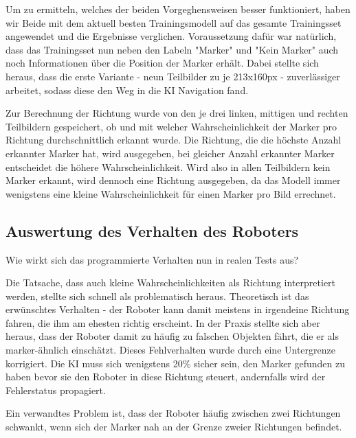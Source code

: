 \documentclass[conference]{IEEEtran}
\begin{document}

Um zu ermitteln, welches der beiden Vorgeghensweisen besser funktioniert, haben wir Beide mit dem aktuell besten Trainingsmodell auf das gesamte Trainingsset angewendet und die Ergebnisse verglichen.
Voraussetzung dafür war natürlich, dass das Trainingsset nun neben den Labeln "Marker" und "Kein Marker" auch noch Informationen über die Position der Marker erhält.
Dabei stellte sich heraus, dass die erste Variante - neun Teilbilder zu je 213x160px - zuverlässiger arbeitet, sodass diese den Weg in die KI Navigation fand.


Zur Berechnung der Richtung wurde von den je drei linken, mittigen und rechten Teilbildern gespeichert, ob und mit welcher Wahrscheinlichkeit der Marker pro Richtung durchschnittlich erkannt wurde.
Die Richtung, die die höchste Anzahl erkannter Marker hat, wird ausgegeben, bei gleicher Anzahl erkannter Marker entscheidet die höhere Wahrscheinlichkeit.
Wird also in allen Teilbildern kein Marker erkannt, wird dennoch eine Richtung ausgegeben, da das Modell immer wenigstens eine kleine Wahrscheinlichkeit für einen Marker pro Bild errechnet.


\subsection {Auswertung des Verhalten des Roboters}	%
Wie wirkt sich das programmierte Verhalten nun in realen Tests aus?

Die Tatsache, dass auch kleine Wahrscheinlichkeiten als Richtung interpretiert werden, stellte sich schnell als problematisch heraus.
Theoretisch ist das erwünschtes Verhalten - der Roboter kann damit meistens in irgendeine Richtung fahren, die ihm am ehesten richtig erscheint.
In der Praxis stellte sich aber heraus, dass der Roboter damit zu häufig zu falschen Objekten fährt, die er als marker-ähnlich einschätzt. Dieses Fehlverhalten wurde durch eine Untergrenze korrigiert. Die KI muss sich wenigstens 20\% sicher sein, den Marker gefunden zu haben bevor sie den Roboter in diese Richtung steuert, andernfalls wird der Fehlerstatus propagiert.

Ein verwandtes Problem ist, dass der Roboter häufig zwischen zwei Richtungen schwankt, wenn sich der Marker nah an der Grenze zweier Richtungen befindet.
\end{document}
